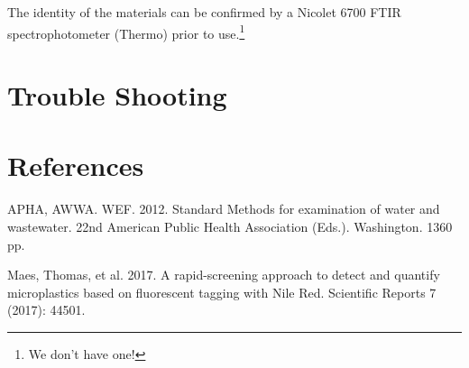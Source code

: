\documentclass[12pt]{../SOP4_alpha}\usepackage[]{graphicx}\usepackage[]{color}
\begin{document}
\NP The identity of the materials can be confirmed by a Nicolet 6700 FTIR
spectrophotometer (Thermo) prior to use.\footnote{We don't have one!} 


\section{Trouble Shooting}

\section{References}

\NP APHA, AWWA. WEF. 2012. Standard Methods for examination of water and wastewater. 22nd American Public Health Association (Eds.). Washington. 1360 pp.

\NP Maes, Thomas, et al. 2017. A rapid-screening approach to detect and quantify microplastics based on fluorescent tagging with Nile Red. Scientific Reports 7 (2017): 44501.


%
\end{document}
